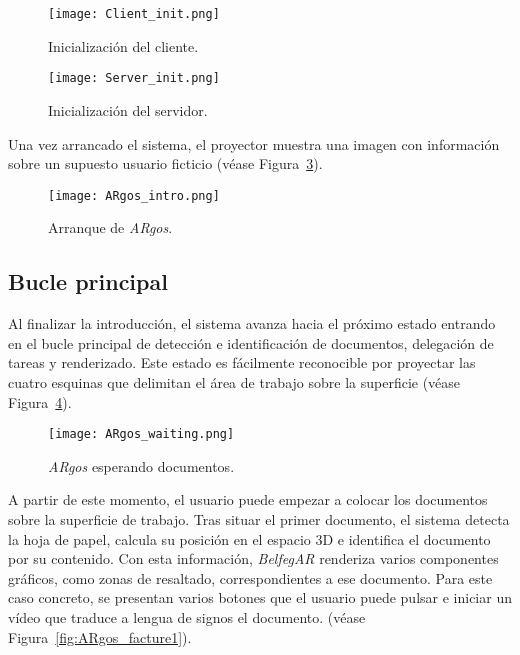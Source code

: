 \begin{figure}[!h]
  \begin{center}
    \texttt{[image: Client\_init.png]}
    \caption{Inicialización del cliente.}
    \label{fig:Client_init}
  \end{center}
\end{figure}

\begin{figure}[!h]
  \begin{center}
    \texttt{[image: Server\_init.png]}
    \caption{Inicialización del servidor.}
    \label{fig:Server_init}
  \end{center}
\end{figure}

Una vez arrancado el sistema, el proyector muestra una imagen con información sobre un supuesto usuario ficticio (véase Figura~\ref{fig:ARgos_intro}).

\begin{figure}
  \begin{center}
    \texttt{[image: ARgos\_intro.png]}
    \caption{Arranque de \textit{ARgos}.}
    \label{fig:ARgos_intro}
  \end{center}
\end{figure}

\subsection{Bucle principal}
Al finalizar la introducción, el sistema avanza hacia el próximo estado entrando en el bucle principal de detección e identificación de documentos, delegación de tareas y renderizado. Este estado es fácilmente reconocible por proyectar las cuatro esquinas que delimitan el área de trabajo sobre la superficie (véase Figura~\ref{fig:ARgos_waiting}).

\begin{figure}
  \begin{center}
    \texttt{[image: ARgos\_waiting.png]}
    \caption{\textit{ARgos} esperando documentos.}
    \label{fig:ARgos_waiting}
  \end{center}
\end{figure}

A partir de este momento, el usuario puede empezar a colocar los documentos sobre la superficie de trabajo. Tras situar el primer documento, el sistema detecta la hoja de papel, calcula su posición en el espacio 3D e identifica el documento por su contenido. Con esta información, \textit{BelfegAR} renderiza varios componentes gráficos, como zonas de resaltado, correspondientes a ese documento. Para este caso concreto, se presentan varios botones que el usuario puede pulsar e iniciar un vídeo que traduce a lengua de signos el documento. (véase Figura~\ref{fig:ARgos_facture1}).

